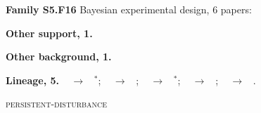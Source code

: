 \documentclass[10pt]{article}
\newcommand{\memb}[1]{\par\smallskip\textbf{#1}\quad}
\begin{document}
\memb{Family S5.F16} Bayesian experimental design, 6 papers: {\footnotesize \citetext{\citealp{Lindley-measure56}\dag; \citealp{MacKay-informationbased92}; \citealp{Hennig-entropy11}; \citealp{HernandezLobato-predictive14}; \citealp{Foster-deep21}; \citealp{Rainforth-modern23}}}

\memb{Other support, 1.} \citetext{\citealp{Depeweg-decomposition17}}

\memb{Other background, 1.} {\footnotesize \citetext{\citealp{Itti-bayesian09}}}

\memb{Lineage, 5.} {\footnotesize \citeauthor{Lindley-measure56}~\citeyear{Lindley-measure56} $\to$ \citeauthor{MacKay-informationbased92}~\citeyear{MacKay-informationbased92}$^\ast$; \citeauthor{Schmidhuber-curious91}~\citeyear{Schmidhuber-curious91} $\to$ \citeauthor{Storck-reinforcement95}~\citeyear{Storck-reinforcement95}; \citeauthor{Schmidhuber-curious91}~\citeyear{Schmidhuber-curious91} $\to$ \citeauthor{Jarrett-curiosity22}~\citeyear{Jarrett-curiosity22}$^\ast$; \citeauthor{Storck-reinforcement95}~\citeyear{Storck-reinforcement95} $\to$ \citeauthor{Sun-planning11}~\citeyear{Sun-planning11}; \citeauthor{Sun-planning11}~\citeyear{Sun-planning11} $\to$ \citeauthor{Houthooft-vime16}~\citeyear{Houthooft-vime16}.}

\medskip\textsc{persistent-disturbance}
\end{document}
